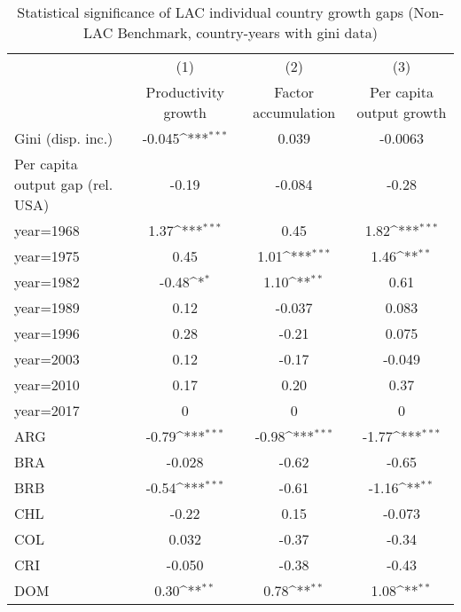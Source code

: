 \begin{sidewaystable}[htbp]\centering
\def\sym#1{\ifmmode^{#1}\else\(^{#1}\)\fi}
\caption{Statistical significance of LAC individual country growth gaps (Non-LAC Benchmark, country-years with gini data)}
\begin{tabular}{l*{3}{c}}
\toprule
                &\multicolumn{1}{c}{(1)}&\multicolumn{1}{c}{(2)}&\multicolumn{1}{c}{(3)}\\
                &\multicolumn{1}{c}{Productivity growth}&\multicolumn{1}{c}{Factor accumulation}&\multicolumn{1}{c}{Per capita output growth}\\
\midrule
Gini (disp. inc.)&   -0.045\sym{***}&    0.039         &  -0.0063         \\
Per capita output gap (rel. USA)&    -0.19         &   -0.084         &    -0.28         \\
year=1968       &     1.37\sym{***}&     0.45         &     1.82\sym{***}\\
year=1975       &     0.45         &     1.01\sym{***}&     1.46\sym{**} \\
year=1982       &    -0.48\sym{*}  &     1.10\sym{**} &     0.61         \\
year=1989       &     0.12         &   -0.037         &    0.083         \\
year=1996       &     0.28         &    -0.21         &    0.075         \\
year=2003       &     0.12         &    -0.17         &   -0.049         \\
year=2010       &     0.17         &     0.20         &     0.37         \\
year=2017       &        0         &        0         &        0         \\
ARG             &    -0.79\sym{***}&    -0.98\sym{***}&    -1.77\sym{***}\\
BRA             &   -0.028         &    -0.62         &    -0.65         \\
BRB             &    -0.54\sym{***}&    -0.61         &    -1.16\sym{**} \\
CHL             &    -0.22         &     0.15         &   -0.073         \\
COL             &    0.032         &    -0.37         &    -0.34         \\
CRI             &   -0.050         &    -0.38         &    -0.43         \\
DOM             &     0.30\sym{**} &     0.78\sym{**} &     1.08\sym{**} \\

\end{tabular}
\end{sidewaystable}
